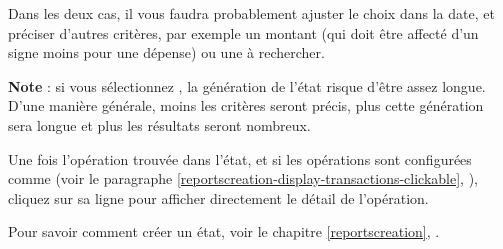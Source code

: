 
Dans les deux cas, il vous faudra probablement ajuster le choix dans la date, et préciser d'autres critères, par exemple un montant (qui doit être affecté d'un signe \og moins \fg{} pour une dépense) ou une  à rechercher. 

\textbf{Note} : si vous sélectionnez , la génération de l'état risque d'être assez longue. D'une manière générale, moins les critères seront précis, plus cette génération sera longue et plus les résultats seront nombreux.

Une fois l'opération trouvée dans l'état, et si les opérations sont configurées comme  (voir le paragraphe \vref{reportscreation-display-transactions-clickable}, ), cliquez sur sa ligne pour afficher directement le détail de l'opération.

Pour savoir comment créer un état, voir le chapitre \vref{reportscreation}, .


